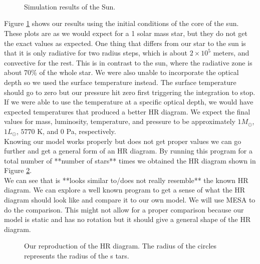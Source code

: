 \documentclass[10pt]{article}
\begin{document}
\begin{figure}[p]
\begin{centering}
 \begin{subfigure}{\textwidth}
  
 \end{subfigure} \\
 \begin{subfigure}{\textwidth}
  
 \end{subfigure} \\
  \begin{subfigure}{\textwidth}
  
 \end{subfigure} \\
   \begin{subfigure}{\textwidth}
  
 \end{subfigure}
 \caption{Simulation results of the Sun.}
 \label{fig:sun}
 \end{centering}
\end{figure}

Figure \ref{fig:sun} shows our results using the initial conditions of the core of the sun. These plots are as we would expect for a 1 solar mass star, but they do not get the exact values as expected. One thing that differs from our star to the sun is that it is only radiative for two radius steps, which is about $2\times 10^5$ meters, and convective for the rest. This is in contrast to the sun, where the radiative zone is about 70\% of the whole star. We were also unable to incorporate the optical depth so we used the surface temperature instead. The surface temperature should go to zero but our pressure hit zero first triggering the integration to stop. If we were able to use the temperature at a specific optical depth, we would have expected temperatures that produced a better HR diagram. We expect the final values for mass, luminosity, temperature, and pressure to be approximately $1 M_\odot$, $1 L_\odot$, $5770$ K, and $0$ Pa, respectively. \\

Knowing our model works properly but does not get proper values we can go further and get a general form of an HR diagram. By running this program for a total number of **number of stars** times we obtained the HR diagram shown in Figure \ref{fig:HR}. \\

We can see that is **looks similar to/does not really resemble** the known HR diagram. We can explore a well known program to get a sense of what the HR diagram should look like and compare it to our own model.  We will use MESA to do the comparison. This might not allow for a proper comparison because our model is static and has no rotation but it should give a general shape of the HR diagram. \\

\begin{figure}[p]
 \begin{centering}
  
  \caption{Our reproduction of the HR diagram. The radius of the circles represents the radius of the s
tars.}
\label{fig:HR}
 \end{centering}
\end{figure}
\end{document}
